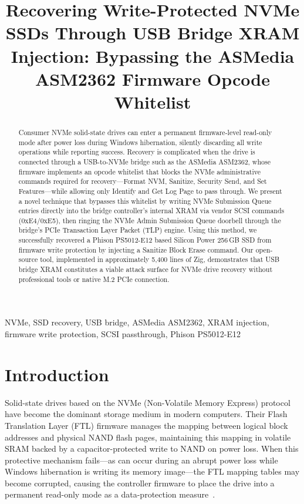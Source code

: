 \documentclass[conference]{IEEEtran}
\begin{document}
\title{Recovering Write-Protected NVMe SSDs Through USB Bridge XRAM Injection: Bypassing the ASMedia ASM2362 Firmware Opcode Whitelist}

\author{
}

\maketitle

\begin{abstract}
Consumer NVMe solid-state drives can enter a permanent firmware-level
read-only mode after power loss during Windows hibernation, silently
discarding all write operations while reporting success. Recovery is
complicated when the drive is connected through a USB-to-NVMe bridge
such as the ASMedia ASM2362, whose firmware implements an opcode
whitelist that blocks the NVMe administrative commands required for
recovery---Format NVM, Sanitize, Security Send, and Set Features---while
allowing only Identify and Get Log Page to pass through. We present a
novel technique that bypasses this whitelist by writing NVMe Submission
Queue entries directly into the bridge controller's internal XRAM via
vendor SCSI commands (0xE4/0xE5), then ringing the NVMe Admin Submission
Queue doorbell through the bridge's PCIe Transaction Layer Packet (TLP)
engine. Using this method, we successfully recovered a Phison PS5012-E12
based Silicon Power 256\,GB SSD from firmware write protection by
injecting a Sanitize Block Erase command. Our open-source tool,
implemented in approximately 5,400 lines of Zig, demonstrates that USB
bridge XRAM constitutes a viable attack surface for NVMe drive recovery
without professional tools or native M.2 PCIe connection.
\end{abstract}

\begin{IEEEkeywords}
NVMe, SSD recovery, USB bridge, ASMedia ASM2362, XRAM injection,
firmware write protection, SCSI passthrough, Phison PS5012-E12
\end{IEEEkeywords}

\section{Introduction}
\label{sec:intro}

Solid-state drives based on the NVMe (Non-Volatile Memory Express)
protocol have become the dominant storage medium in modern computers.
Their Flash Translation Layer (FTL) firmware manages the mapping between
logical block addresses and physical NAND flash pages, maintaining this
mapping in volatile SRAM backed by a capacitor-protected write to NAND
on power loss. When this protective mechanism fails---as can occur during
an abrupt power loss while Windows hibernation is writing its memory
image---the FTL mapping tables may become corrupted, causing the
controller firmware to place the drive into a permanent read-only mode as
a data-protection measure~\cite{zheng2013understanding}.
\end{document}
